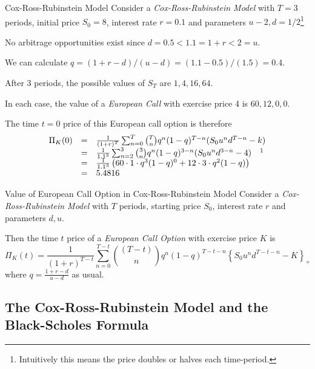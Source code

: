 \documentclass[11pt,a4paper]{article}
\begin{document}
  \begin{example}{Cox-Ross-Rubinstein Model}
    Consider a \textit{Cox-Ross-Rubinstein Model} with $T=3$ periods, initial price $S_0=8$, interest rate $r=0.1$ and parameters $u-2,d=1/2$\footnote{Intuitively this means the price doubles or halves each time-period.}
    \par No arbitrage opportunities exist since $d=0.5<1.1=1+r<2=u$.
    \par We can calculate $q=(1+r-d)/(u-d)=(1.1-0.5)/(1.5)=0.4$.
    \par After 3 periods, the possible values of $S_T$ are $1,4,16,64$.
    \par In each case, the value of a \textit{European Call} with exercise price 4 is $60,12,0,0$.
    \par The time $t=0$ price of this European call option is therefore
    \[\begin{array}{rcl}
      \Pi_K(0)&=&\frac1{(1+r)^T}\sum_{n=0}^T{T\choose n}q^n(1-q)^{T-n}(S_0u^nd^{T-n}-k)\\
      &=&\frac1{1.1^3}\sum_{n=2}^3{3\choose n}q^n(1-q)^{3-n}(S_0u^nd^{3-n}-4)\quad\footnotemark\\
      &=&\frac1{1.1^3}\left(60\cdot1\cdot q^3(1-q)^0+12\cdot3\cdot q^2(1-q)\right)\\
      &=&5.4816
    \end{array}\]
  \end{example}

  \begin{proposition}{Value of European Call Option in Cox-Ross-Rubinstein Model}\label{prop_european_call_crr_model}
    Consider a \textit{Cox-Ross-Rubinstein Model} with $T$ periods, starting price $S_0$, interest rate $r$ and parameters $d,u$.
    \par Then the time $t$ price of a \textit{European Call Option} with exercise price $K$ is
    \[ \Pi_K(t)=\frac1{(1+r)^{T-t}}\sum_{n=0}^{T-t}{{(T-t)}\choose n}q^n(1-q)^{T-t-n}\left\{S_0u^nd^{T-t-n}-K\right\}_+ \]
    where $q=\frac{1+r-d}{u-d}$ as usual.
  \end{proposition}

\subsection{The Cox-Ross-Rubinstein Model and the Black-Scholes Formula}
\end{document}

